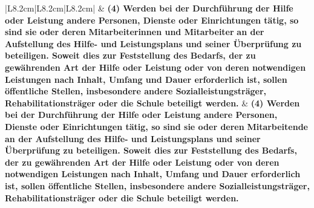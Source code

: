 \documentclass[10pt,a4paper,landscape]{article}
\begin{document}
\begin{longtable}{|L{8.2cm}|L{8.2cm}|L{8.2cm}|}
 & \textbf{(4) Werden bei der Durchführung der  \newline Hilfe oder Leistung andere Personen,  \newline Dienste oder Einrichtungen tätig, so  \newline sind sie oder deren }\textbf{\textcolor{diffred}{Mitarbeiterinnen  \newline und Mitarbeiter}}\textbf{ an der Aufstellung des  \newline Hilfe- und Leistungsplans und seiner  \newline Überprüfung zu beteiligen. Soweit dies  \newline zur Feststellung des Bedarfs, der zu  \newline gewährenden Art der Hilfe oder Leistung  \newline oder von deren notwendigen Leistungen  \newline nach Inhalt, Umfang und Dauer  \newline erforderlich ist, sollen öffentliche  \newline Stellen, insbesondere andere  \newline Sozialleistungsträger,  \newline Rehabilitationsträger oder die Schule  \newline beteiligt werden. } & \textbf{(4) Werden bei der Durchführung der  \newline Hilfe oder Leistung andere Personen,  \newline Dienste oder Einrichtungen tätig, so  \newline sind sie oder deren }\textbf{\textcolor{diffgreen}{Mitarbeitende}}\textbf{ an der  \newline Aufstellung des Hilfe- und  \newline Leistungsplans und seiner Überprüfung  \newline zu beteiligen. Soweit dies zur  \newline Feststellung des Bedarfs, der zu  \newline gewährenden Art der Hilfe oder Leistung  \newline oder von deren notwendigen Leistungen  \newline nach Inhalt, Umfang und Dauer  \newline erforderlich ist, sollen öffentliche  \newline Stellen, insbesondere andere  \newline Sozialleistungsträger,  \newline Rehabilitationsträger oder die Schule  \newline beteiligt werden. } \\

\end{longtable}
\end{document}
